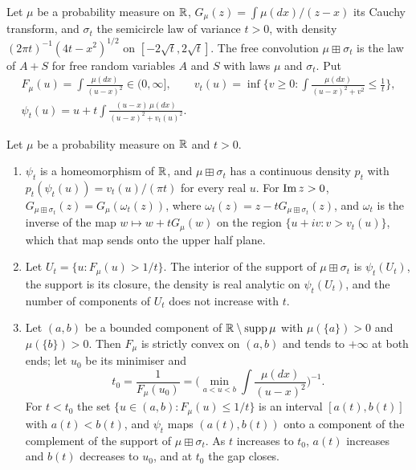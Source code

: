 Let $\mu$ be a probability measure on $\mathbb{R}$, $G_\mu(z)=\int\mu(dx)/(z-x)$ its Cauchy transform, and $\sigma_t$ the semicircle law of variance $t>0$, with density $(2\pi t)^{-1}(4t-x^2)^{1/2}$ on $[-2\sqrt t,2\sqrt t]$. The free convolution $\mu\boxplus\sigma_t$ is the law of $A+S$ for free random variables $A$ and $S$ with laws $\mu$ and $\sigma_t$. Put
\begin{gather*}
F_\mu(u)=\int\frac{\mu(dx)}{(u-x)^2}\in(0,\infty],\qquad v_t(u)=\inf\Big\{v\ge0:\int\frac{\mu(dx)}{(u-x)^2+v^2}\le\frac1t\Big\},\\
\psi_t(u)=u+t\int\frac{(u-x)\,\mu(dx)}{(u-x)^2+v_t(u)^2}.
\end{gather*}

\begin{theorem}\label{thm:wigbiane:biane}
Let $\mu$ be a probability measure on $\mathbb{R}$ and $t>0$.
\begin{enumerate}
\item[(a)] $\psi_t$ is a homeomorphism of $\mathbb{R}$, and $\mu\boxplus\sigma_t$ has a continuous density $p_t$ with $p_t(\psi_t(u))=v_t(u)/(\pi t)$ for every real $u$. For $\operatorname{Im} z>0$, $G_{\mu\boxplus\sigma_t}(z)=G_\mu(\omega_t(z))$, where $\omega_t(z)=z-tG_{\mu\boxplus\sigma_t}(z)$, and $\omega_t$ is the inverse of the map $w\mapsto w+tG_\mu(w)$ on the region $\{u+iv:v>v_t(u)\}$, which that map sends onto the upper half plane.
\item[(b)] Let $U_t=\{u:F_\mu(u)>1/t\}$. The interior of the support of $\mu\boxplus\sigma_t$ is $\psi_t(U_t)$, the support is its closure, the density is real analytic on $\psi_t(U_t)$, and the number of components of $U_t$ does not increase with $t$.
\item[(c)] Let $(a,b)$ be a bounded component of $\mathbb{R}\setminus\operatorname{supp}\mu$ with $\mu(\{a\})>0$ and $\mu(\{b\})>0$. Then $F_\mu$ is strictly convex on $(a,b)$ and tends to $+\infty$ at both ends; let $u_0$ be its minimiser and
\begin{equation}\label{eq:wigbiane:threshold}
t_0=\frac1{F_\mu(u_0)}=\Big(\min_{a<u<b}\int\frac{\mu(dx)}{(u-x)^2}\Big)^{-1}.
\end{equation}
For $t<t_0$ the set $\{u\in(a,b):F_\mu(u)\le1/t\}$ is an interval $[a(t),b(t)]$ with $a(t)<b(t)$, and $\psi_t$ maps $(a(t),b(t))$ onto a component of the complement of the support of $\mu\boxplus\sigma_t$. As $t$ increases to $t_0$, $a(t)$ increases and $b(t)$ decreases to $u_0$, and at $t_0$ the gap closes.
\end{enumerate}
\end{theorem}

